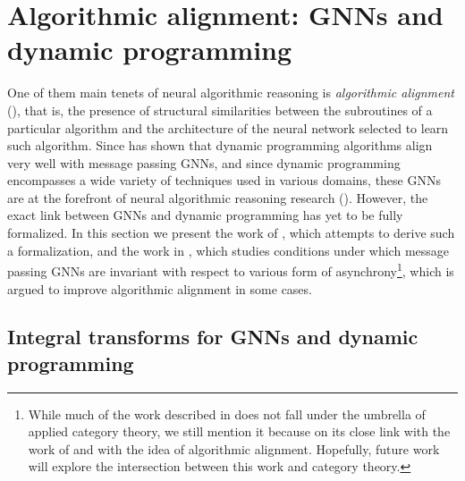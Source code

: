 \documentclass[11pt,a4paper,openright,twoside]{report}
\theoremstyle{plain}
\theoremstyle{definition}
\begin{document}
\section{Algorithmic alignment: GNNs and dynamic programming}

One of them main tenets of neural algorithmic reasoning is \textit{algorithmic alignment} (\cite{xu2019can}), that is, the presence of structural similarities between the subroutines of a particular algorithm and the architecture of the neural network selected to learn such algorithm.
Since \cite{xu2019can} has shown that dynamic programming algorithms align very well with message passing GNNs, and since dynamic programming encompasses a wide variety of techniques used in various domains, these GNNs  are at the forefront of neural algorithmic reasoning research (\cite{dudzik2022graph}). However, the exact link between GNNs and dynamic programming has yet to be fully formalized. In this section we present the work of \cite{dudzik2022graph}, which attempts to derive such a formalization, and the work in \cite{dudzik2024asynchronous}, which studies conditions under which message passing GNNs are invariant with respect to various form of asynchrony\footnote{While much of the work described in \cite{dudzik2024asynchronous} does not fall under the umbrella of applied category theory, we still mention it because on its close link with the work of \cite{dudzik2022graph} and with the idea of algorithmic alignment. Hopefully, future work will explore the intersection between this work and category theory.}, which is argued to improve algorithmic alignment in some cases.


\subsection{Integral transforms for GNNs and dynamic programming}
\end{document}
